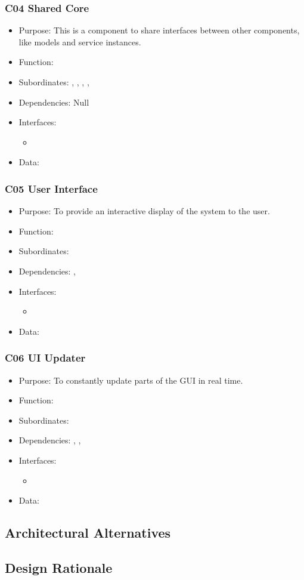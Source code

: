 \subsubsection{C04 Shared Core} \label{compShared}
\begin{itemize}
	\item Purpose: This is a component to share interfaces between other components, like models and service instances.
	\item Function:
	\item Subordinates: , , , , 
	\item Dependencies: Null
	\item Interfaces:
	\begin{itemize}
		\item
	\end{itemize}
	\item Data:
\end{itemize}

\subsubsection{C05 User Interface} \label{compUI}
\begin{itemize}
	\item Purpose: To provide an interactive display of the system to the user.
	\item Function: 
	\item Subordinates: 
	\item Dependencies: , 
	\item Interfaces:
	\begin{itemize}
		\item
	\end{itemize}
	\item Data:
\end{itemize}

\subsubsection{C06 UI Updater} \label{compUIUpdater}
\begin{itemize}
	\item Purpose: To constantly update parts of the GUI in real time.
	\item Function: 
	\item Subordinates:
	\item Dependencies: , , 
	\item Interfaces:
	\begin{itemize}
		\item
	\end{itemize}
	\item Data:
\end{itemize}

\subsection{Architectural Alternatives}
\subsection{Design Rationale}